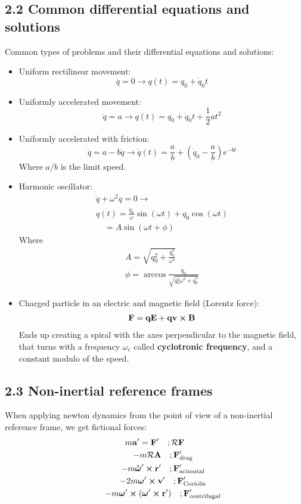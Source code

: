 \documentclass[a4paper,landscape,10pt]{cheatsheet}
\begin{document}
\subsection*{2.2 Common differential equations and solutions}
Common types of problems and their differential equations and solutions:
\begin{itemize}
  \item Uniform rectilinear movement:
        $$
          \ddot{q} = 0 \longrightarrow q(t) = q_0 + \dot{q}_0 t
        $$
  \item Uniformly accelerated movement:
        $$
          \ddot{q} = a \longrightarrow q(t) = q_0 + \dot{q}_0 t + \frac{1}{2}at^2
        $$
  \item Uniformly accelerated with friction:
        $$
          \ddot{q} = a - b\dot{q} \longrightarrow \dot{q}(t) = \frac{a}{b} + \left(\dot{q}_0 - \frac{a}{b}\right)e^{-bt}
        $$
        Where $a/b$ is the limit speed.
  \item Harmonic oscillator:
        \begin{gather*}
          \ddot{q} + \omega^2 q=0 \rightarrow                             \\
          q(t)=\frac{\dot{q}_0}{\omega}\sin(\omega t) + q_0\cos(\omega t) \\
          \quad = A\sin(\omega t+\phi)
        \end{gather*}
        Where
        \begin{gather*}
          A=\sqrt{q^2_0 + \frac{\dot{q}^2_0}{\omega^2}} \\
          \phi = \arccos\frac{\dot{q}_0}{\sqrt{q^2_0\omega^2+\dot{q}^2_0}}
        \end{gather*}
  \item Charged particle in an electric and magnetic field (Lorentz force):
        \begin{gather*}
          \bf{F} = q\bf{E}+q\bf{v}\cross\bf{B} \\
        \end{gather*}
        Ends up creating a spiral with the axes perpendicular to the magnetic field, that turns with a frequency $\omega_c$
        called \textbf{cyclotronic frequency}, and a constant modulo of the speed.
\end{itemize}

\subsection*{2.3 Non-inertial reference frames}
When applying newton dynamics from the point of view of a non-inertial reference frame, we get fictional forces:
\begin{gather*}
  m\bf{a}' = \bf{F}' \quad ;\mathcal{R}\bf{F}\\
  \qquad -m\mathcal{R}\bf{A} \quad ;\bf{F}'_\text{drag}\\
  \qquad -m\boldsymbol{\dot{\omega}}'\cross \bf{r}' \quad ;\bf{F}'_\text{acimutal}\\
  \qquad - 2m\boldsymbol{\omega}'\cross\bf{v}' \quad ;\bf{F}'_{\text{Coriolis}}\\
  \qquad -m\boldsymbol{\omega}'\cross(\boldsymbol{\omega}'\cross\bf{r}')  \quad ;\bf{F}'_{\text{centrifugal}}
\end{gather*}
\end{document}
